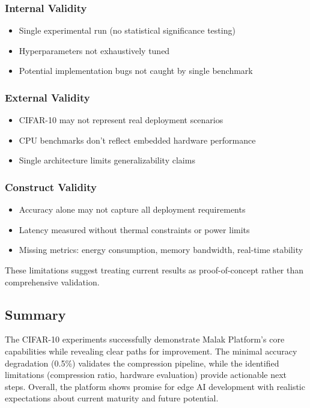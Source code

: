 \subsubsection{Internal Validity}
\begin{itemize}
\item Single experimental run (no statistical significance testing)
\item Hyperparameters not exhaustively tuned
\item Potential implementation bugs not caught by single benchmark
\end{itemize}

\subsubsection{External Validity}
\begin{itemize}
\item CIFAR-10 may not represent real deployment scenarios
\item CPU benchmarks don't reflect embedded hardware performance
\item Single architecture limits generalizability claims
\end{itemize}

\subsubsection{Construct Validity}
\begin{itemize}
\item Accuracy alone may not capture all deployment requirements
\item Latency measured without thermal constraints or power limits
\item Missing metrics: energy consumption, memory bandwidth, real-time stability
\end{itemize}

These limitations suggest treating current results as proof-of-concept rather than comprehensive validation.

\subsection{Summary}

The CIFAR-10 experiments successfully demonstrate Malak Platform's core capabilities while revealing clear paths for improvement. The minimal accuracy degradation (0.5\%) validates the compression pipeline, while the identified limitations (compression ratio, hardware evaluation) provide actionable next steps. Overall, the platform shows promise for edge AI development with realistic expectations about current maturity and future potential.
